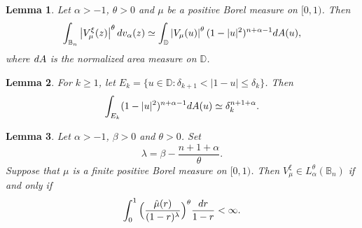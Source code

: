 \documentclass[10pt,a4paper]{amsart}
\newtheorem{lemma}{Lemma}
\begin{document}
\begin{lemma}\label{lemma4.1}
Let $\alpha>-1$, $\theta>0$ and $\mu$ be a positive Borel measure on $[0,1)$. Then
\begin{equation}\label{equa4.1}
\int_{\mathbb{B}_n}\left|V_{\mu}^{\xi}(z)\right|^{\theta}{\rm d}v_{\alpha}(z)\simeq \int_{\mathbb{D}}\left|V_{\mu}(u)\right|^{\theta}(1-|u|^2)^{n+\alpha-1}{\rm d}A(u),
\end{equation}
where ${\rm d}A$ is the normalized area measure on $\mathbb{D}$.
\end{lemma}

\begin{lemma}\label{lemma4.2}
For $k\geq 1$, let $E_k=\{u\in\mathbb{D}: \delta_{k+1}<|1-u|\leq \delta_k\}$. Then 
\begin{equation*}
\int_{E_k}(1-|u|^2)^{n+\alpha-1}{\rm d}A(u)\simeq \delta_{k}^{n+1+\alpha}.
\end{equation*}
\end{lemma}

\begin{lemma}\label{lemma4.3}
Let $\alpha>-1$, $\beta>0$ and   $\theta>0$. Set
\[
    \lambda=\beta-\frac{n+1+\alpha}{\theta}.
\]
Suppose that $\mu$ is a finite positive Borel measure on $[0,1)$. Then $V_{\mu}^{\xi}\in L_{\alpha}^{\theta}(\mathbb{B}_n)$ if and only if
\begin{equation}\label{equa4.3}
\int_{0}^1\Big(\frac{\hat{\mu}(r)}{(1-r)^{\lambda}}\Big)^{\theta}\frac{{\rm d}r}{1-r}<\infty.
\end{equation}
\end{lemma}
\end{document}
